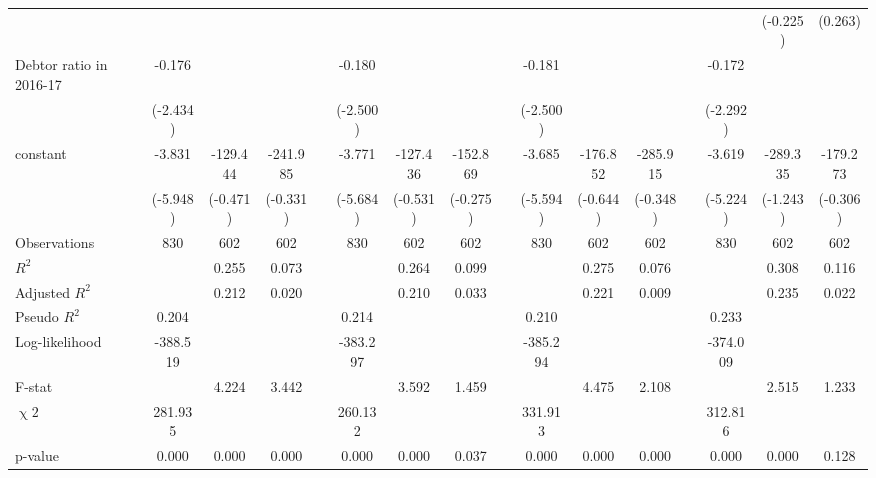 {\begin{longtable}{@{\extracolsep{\fill}}lccccccccccccccc}
      &   &   &   &   &   &   &   &   &   &   &   &   &   & (-0.225) & (0.263) \\
    Debtor ratio in 2016-17 & -0.176 &   &   &   & -0.180 &   &   &   & -0.181 &   &   &   & -0.172 &   &  \\
      & (-2.434) &   &   &   & (-2.500) &   &   &   & (-2.500) &   &   &   & (-2.292) &   &  \\
    constant & -3.831 & -129.444 & -241.985 &   & -3.771 & -127.436 & -152.869 &   & -3.685 & -176.852 & -285.915 &   & -3.619 & -289.335 & -179.273 \\
      & (-5.948) & (-0.471) & (-0.331) &   & (-5.684) & (-0.531) & (-0.275) &   & (-5.594) & (-0.644) & (-0.348) &   & (-5.224) & (-1.243) & (-0.306) \\
    \midrule
    Observations & 830 & 602 & 602 &   & 830 & 602 & 602 &   & 830 & 602 & 602 &   & 830 & 602 & 602 \\
    $R^2$ &   & 0.255 & 0.073 &   &   & 0.264 & 0.099 &   &   & 0.275 & 0.076 &   &   & 0.308 & 0.116 \\
    Adjusted $R^2$ &   & 0.212 & 0.020 &   &   & 0.210 & 0.033 &   &   & 0.221 & 0.009 &   &   & 0.235 & 0.022 \\
    Pseudo $R^2$ & 0.204 &   &   &   & 0.214 &   &   &   & 0.210 &   &   &   & 0.233 &   &  \\
    Log-likelihood & -388.519 &   &   &   & -383.297 &   &   &   & -385.294 &   &   &   & -374.009 &   &  \\
    F-stat &   & 4.224 & 3.442 &   &   & 3.592 & 1.459 &   &   & 4.475 & 2.108 &   &   & 2.515 & 1.233 \\
    $\upchi2$ & 281.935 &   &   &   & 260.132 &   &   &   & 331.913 &   &   &   & 312.816 &   &  \\
    p-value & 0.000 & 0.000 & 0.000 &   & 0.000 & 0.000 & 0.037 &   & 0.000 & 0.000 & 0.000 &   & 0.000 & 0.000 & 0.128 \\
    \bottomrule
    \end{longtable}%
}